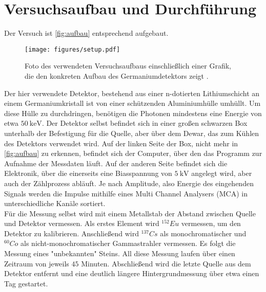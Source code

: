 \section{Versuchsaufbau und Durchführung}
\label{sec:Durchführung}

Der Versuch ist \autoref{fig:aufbau} entsprechend aufgebaut.

\begin{figure}[H]
    \centering
    \texttt{[image: figures/setup.pdf]}
    \caption{Foto des verwendeten Versuchsaufbaus einschließlich einer Grafik, die den konkreten Aufbau des Germaniumdetektors zeigt \cite{v18}.}
    \label{fig:aufbau}
\end{figure}

Der hier verwendete Detektor, bestehend aus einer n-dotierten Lithiumschicht an einem Germaniumkristall ist von einer schützenden Aluminiumhülle umhüllt.
Um diese Hülle zu durchdringen, benötigen die Photonen mindestens eine Energie von etwa $\SI{50}{\kilo\eV}$.
Der Detektor selbst befindet sich in einer großen schwarzen Box unterhalb der Befestigung für die Quelle, aber über dem Dewar,
das zum Kühlen des Detektors verwendet wird.
Auf der linken Seite der Box, nicht mehr in \autoref{fig:aufbau} zu erkennen, befindet sich der Computer, über den das Programm zur Aufnahme
der Messdaten läuft.
Auf der anderen Seite befindet sich die Elektronik, über die einerseits eine Biasspannung von $\SI{5}{\kilo\volt}$ angelegt wird,
aber auch der Zählprozess abläuft.
Je nach Amplitude, also Energie des eingehenden Signals werden die Impulse mithilfe eines Multi Channel Analysers (MCA) in unterschiedliche
Kanäle sortiert. \\

Für die Messung selbst wird mit einem Metallstab der Abstand zwischen Quelle und Detektor vermessen.
Als erstes Element wird $^{152} Eu$ vermessen, um den Detektor zu kalibrieren.
Anschließend wird $^{137} Cs$ als monochromatischer und $^{60} Co$ als nicht-monochromatischer Gammastrahler vermessen.
Es folgt die Messung eines "unbekannten" Steins.
All diese Messung laufen über einen Zeitraum von jeweils $45$ Minuten.
Abschließend wird die letzte Quelle aus dem Detektor entfernt und eine deutlich längere Hintergrundmessung über etwa einen Tag gestartet.
